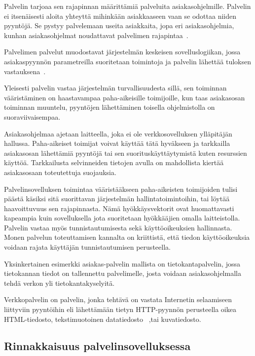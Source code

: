 \documentclass[finnish]{tktltiki2}
\theoremstyle{definition}
\theoremstyle{remark}
\begin{document}
Palvelin tarjoaa sen rajapinnan määrittämiä palveluita asiakasohjelmille.
Palvelin ei itsenäisesti aloita yhteyttä mihinkään
asiakkaaseen vaan se odottaa niiden pyyntöjä.
Se pystyy palvelemaan useita asiakkaita, jopa
eri asiakasohjelmia, kunhan asiakasohjelmat noudattavat
palvelimen rajapintaa~\cite{sinha_client-server_1992}.

Palvelimen palvelut muodostavat järjestelmän keskeisen
sovelluslogiikan, jossa asiakaspyynnön parametreilla
suoritetaan toimintoja ja palvelin lähettää
tuloksen vastauksena~\cite{sinha_client-server_1992}.

Yleisesti palvelin vastaa järjestelmän turvallisuudesta sillä,
sen toiminnan vääristäminen on haastavampaa paha-aikeisille
toimijoille, kun taas asiakasosan toiminnan muuntelu, pyyntöjen
lähettäminen toisella ohjelmistolla on suoraviivaisempaa.

Asiakasohjelmaa ajetaan laitteella, joka ei ole verkkosovelluksen
ylläpitäjän hallussa. Paha-aikeiset toimijat voivat käyttää tätä hyväkseen
ja tarkkailla asiakasosan lähettämiä pyyntöjä tai sen
suorituskäyttäytymistä kuten resurssien käyttöä.
Tarkkailusta selvinneiden tietojen avulla on mahdollista
kiertää asiakasosaan toteutettuja suojauksia.

Palvelinsovelluksen toimintaa vääristääkseen
paha-aikeisten toimijoiden tulisi päästä
käsiksi sitä suorittavan järjestelmän hallintatoimintoihin, tai
löytää haavoittuvuus sen rajapinnasta. Nämä hyökkäysvektorit
ovat huomattavasti kapeampia kuin sovelluksella jota
suoritetaan hyökkääjien omalla laitteistolla.
Palvelin vastaa myös tunnistautumisesta sekä käyttöoikeuksien hallinnasta.
Monen palvelun toteuttamisen kannalta on kriittistä, että
tiedon käyttöoikeuksia voidaan rajata käyttäjän tunnistautumisen perusteella.

Yksinkertainen esimerkki asiakas-palvelin mallista on tietokantapalvelin,
jossa tietokannan tiedot on tallennettu palvelimelle, josta voidaan
asiakasohjelmalla tehdä verkon yli tietokantakyselyitä.

Verkkopalvelin on palvelin, jonka tehtävä on vastata Internetin
selaamiseen liittyviin pyyntöihin eli lähettämään tietyn HTTP-pyynnön
perusteella oikea HTML-tiedosto, tekstimuotoinen datatiedosto~\cite{Berners-Lee_1994}
,tai kuvatiedosto.
\subsection{Rinnakkaisuus palvelinsovelluksessa}
\end{document}
